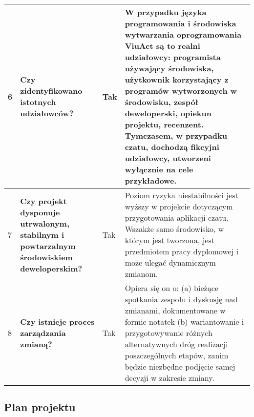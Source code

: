 \documentclass[11pt,oneside,a4paper,titlepage,onecolumn]{article}
\begin{document}
\begin{tabularx}{\textwidth}{|l|X|l|X|}
    6
    & \textbf{Czy zidentyfikowano istotnych udziałowców?}
    &  Tak
    &  W przypadku języka programowania i środowiska wytwarzania oprogramowania ViuAct są to realni udziałowcy: 
    programista używający środowiska, użytkownik korzystający z programów wytworzonych w środowisku, zespół 
    deweloperski, opiekun projektu, recenzent. Tymczasem, w przypadku czatu, dochodzą fikcyjni udziałowcy, utworzeni 
    wyłącznie na cele przykładowe.
    \\\hline
    
    7
    & \textbf{Czy projekt dysponuje utrwalonym, stabilnym i powtarzalnym środowiskiem deweloperskim?} 
    &  Tak
    & Poziom ryzyka niestabilności jest wyższy w projekcie dotyczącym przygotowania aplikacji czatu. Wszakże samo 
    środowisko, w którym jest tworzona, jest przedmiotem pracy dyplomowej i może ulegać dynamicznym zmianom.
    \\\hline
    
    8
    & \textbf{Czy istnieje proces zarządzania zmianą?} 
    & Tak
    & Opiera się on o: (a) bieżące spotkania zespołu i dyskusję nad zmianami, dokumentowane w formie notatek 
    (b) wariantowanie i przygotowywanie różnych alternatywnych dróg realizacji poszczególnych etapów, zanim będzie 
    niezbędne podjęcie samej decyzji w zakresie zmiany.
    \\\hline

\end{tabularx}

\subsection{Plan projektu}
\end{document}
